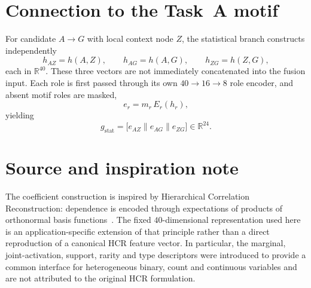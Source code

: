 \section{Connection to the Task~A motif}
\label{app:hcr-motif}

For candidate $A\to G$ with local context node $Z$, the statistical branch constructs independently
\begin{equation}
h_{AZ}=h(A,Z),\qquad
h_{AG}=h(A,G),\qquad
h_{ZG}=h(Z,G),
\end{equation}
each in $\mathbb{R}^{40}$.
These three vectors are not immediately concatenated into the fusion input.
Each role is first passed through its own $40\to 16\to 8$ role encoder, and absent motif roles are masked,
\begin{equation}
e_{r}=m_{r}\,E_{r}(h_{r}),
\end{equation}
yielding
\begin{equation}
g_{\mathrm{stat}}
=
\bigl[e_{AZ}\parallel e_{AG}\parallel e_{ZG}\bigr]
\in\mathbb{R}^{24}.
\end{equation}

\section{Source and inspiration note}
\label{app:hcr-source}

The coefficient construction is inspired by Hierarchical Correlation Reconstruction: dependence is encoded through expectations of products of orthonormal basis functions~\cite{duda2018hcr,duda2018hcr-ts,duda2020hcr-income}.
The fixed $40$-dimensional representation used here is an application-specific extension of that principle rather than a direct reproduction of a canonical HCR feature vector.
In particular, the marginal, joint-activation, support, rarity and type descriptors were introduced to provide a common interface for heterogeneous binary, count and continuous variables and are not attributed to the original HCR formulation.
